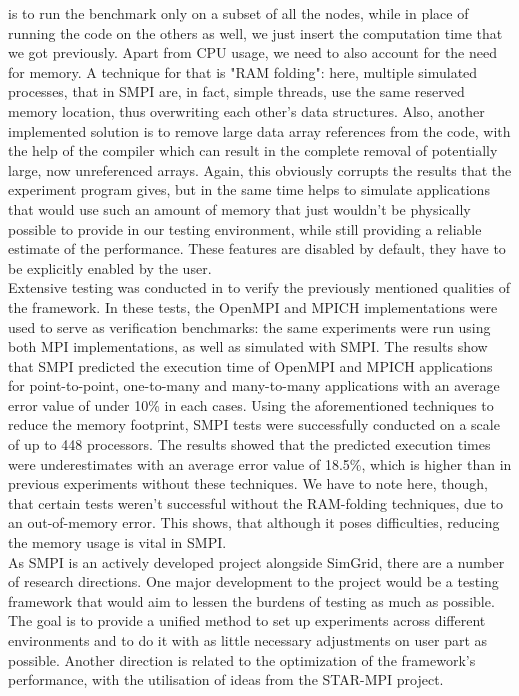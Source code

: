 is to run the
benchmark only on a subset of all the nodes, while in place of running
the code on the others as well, we just insert the computation time
that we got previously. Apart from CPU usage, we need to also account
for the need for memory. A technique for that is "RAM folding": here,
multiple simulated processes, that in SMPI are, in fact, simple
threads, use the same reserved memory location, thus overwriting each
other's data structures. Also, another implemented solution is to
remove large data array references from the code, with the help of the
compiler which can result in the complete removal of potentially
large, now unreferenced arrays. Again, this obviously corrupts the
results that the experiment program gives, but in the same time helps
to simulate applications that would use such an amount of memory that
just wouldn't be physically possible to provide in our testing
environment, while still providing a reliable estimate of the
performance.\cite{bdglmqssv13} These features are disabled by default,
they have to be explicitly enabled by the user.\\
Extensive testing was conducted in \cite{csgscq11} to verify the
previously mentioned qualities of the framework. In these tests, the
OpenMPI and MPICH implementations were used to serve as verification
benchmarks: the same experiments were run using both MPI
implementations, as well as simulated with SMPI. The
results show that SMPI predicted the execution time of OpenMPI and
MPICH applications for point-to-point, one-to-many and many-to-many
applications with an average error value of under 10\% in each
cases. Using the aforementioned techniques to reduce the memory
footprint, SMPI tests
were successfully conducted on a scale of up to 448 processors. The
results showed that the predicted execution times were
underestimates with an average error value of 18.5\%, which is higher
than in previous experiments without these techniques. We have to note
here, though, that
certain tests weren't successful without the RAM-folding techniques,
due to an out-of-memory error. This shows, that although it poses
difficulties, reducing the memory usage is vital in SMPI.\\
As SMPI is an actively developed project alongside SimGrid, there are
a number of research directions. One major development to the
project would be a testing framework that would aim to lessen the
burdens of testing as much as possible. The goal is to provide a
unified method to set up experiments across different environments and
to do it with as little necessary adjustments on user part as
possible. Another direction is related to the optimization of the
framework's performance, with the utilisation of ideas from the
STAR-MPI project.

